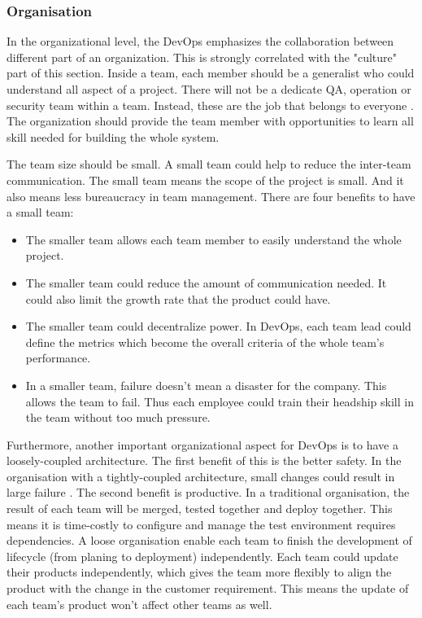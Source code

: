 \subsubsection[]{Organisation}
In the organizational level, the DevOps emphasizes the collaboration between different part of an organization. This is strongly correlated with the "culture" part of this section. Inside a team, each member should be a generalist who could understand all aspect of a project. There will not be a dedicate QA, operation or security team within a team. Instead, these are the job that belongs to everyone \cite{feitelson2013development}\cite{kim2016devops}. The organization should provide the team member with opportunities to learn all skill needed for building the whole system. 
\par
The team size should be small. A small team could help to reduce the inter-team communication. The small team means the scope of the project is small. And it also means less bureaucracy in team management. There are four benefits \cite{kim2016devops} to have a small team:
\begin{itemize}
    \item The smaller team allows each team member to easily understand the whole project.
    \item The smaller team could reduce the amount of communication needed. It could also limit the growth rate that the product could have.
    \item The smaller team could decentralize power. In DevOps, each team lead could define the metrics which become the overall criteria of the whole team's performance.
    \item In a smaller team, failure doesn't mean a disaster for the company. This allows the team to fail. Thus each employee could train their headship skill in the team without too much pressure. 
\end{itemize} 
\par
Furthermore, another important organizational aspect for DevOps is to have a loosely-coupled architecture. 
The first benefit of this is the better safety.
In the organisation with a tightly-coupled architecture, small changes could result in large failure \cite{kim2016devops}.
The second benefit is productive. In a traditional organisation, the result of each team will be merged, tested together and deploy together. This means it is time-costly to configure and manage the test environment requires dependencies. A loose organisation enable each team to finish the development of lifecycle (from planing to deployment) independently. Each team could update their products independently, which gives the team more flexibly to align the product with the change in the customer requirement. This means the update of each team's product won't affect other teams as well.
